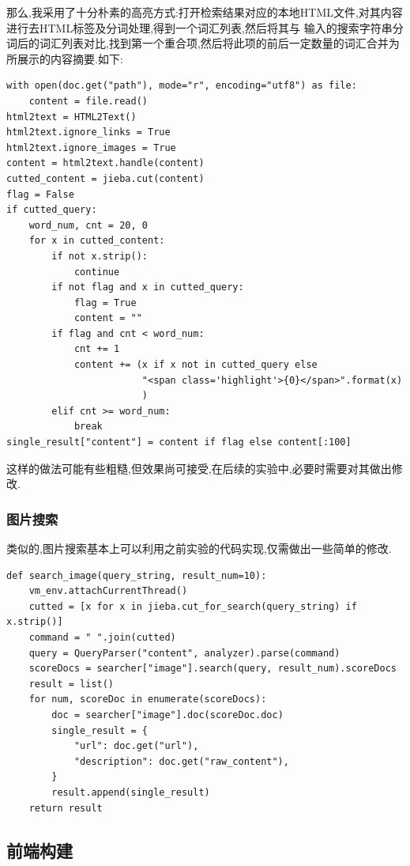 \documentclass[a4paper]{article}
\begin{document}
那么,我采用了十分朴素的高亮方式:打开检索结果对应的本地HTML文件,对其内容进行去HTML标签及分词处理,得到一个词汇列表,然后将其与
输入的搜索字符串分词后的词汇列表对比,找到第一个重合项,然后将此项的前后一定数量的词汇合并为所展示的内容摘要.如下:
\begin{verbatim}
with open(doc.get("path"), mode="r", encoding="utf8") as file:
    content = file.read()
html2text = HTML2Text()
html2text.ignore_links = True
html2text.ignore_images = True
content = html2text.handle(content)
cutted_content = jieba.cut(content)
flag = False
if cutted_query:
    word_num, cnt = 20, 0
    for x in cutted_content:
        if not x.strip():
            continue
        if not flag and x in cutted_query:
            flag = True
            content = ""
        if flag and cnt < word_num:
            cnt += 1
            content += (x if x not in cutted_query else
                        "<span class='highlight'>{0}</span>".format(x)
                        )
        elif cnt >= word_num:
            break
single_result["content"] = content if flag else content[:100]
\end{verbatim}

这样的做法可能有些粗糙,但效果尚可接受,在后续的实验中,必要时需要对其做出修改.
            \subsubsection{图片搜索}
类似的,图片搜索基本上可以利用之前实验的代码实现,仅需做出一些简单的修改.
\begin{verbatim}
def search_image(query_string, result_num=10):
    vm_env.attachCurrentThread()
    cutted = [x for x in jieba.cut_for_search(query_string) if x.strip()]
    command = " ".join(cutted)
    query = QueryParser("content", analyzer).parse(command)
    scoreDocs = searcher["image"].search(query, result_num).scoreDocs
    result = list()
    for num, scoreDoc in enumerate(scoreDocs):
        doc = searcher["image"].doc(scoreDoc.doc)
        single_result = {
            "url": doc.get("url"),
            "description": doc.get("raw_content"),
        }
        result.append(single_result)
    return result
\end{verbatim}
        \subsection{前端构建}
\end{document}

